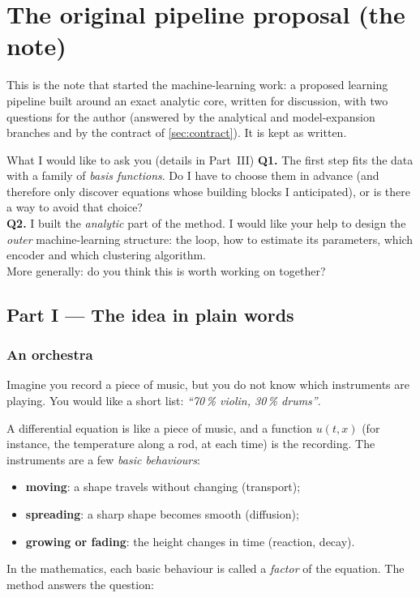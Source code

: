 \section{The original pipeline proposal (the note)}\label{app:note}
\noindent This is the note that started the machine-learning work: a proposed learning pipeline built around an exact analytic core, written for discussion, with two questions for the author (answered by the analytical and model-expansion branches and by the contract of \cref{sec:contract}). It is kept as written.




\begin{askbox}{What I would like to ask you (details in Part~III)}
\textbf{Q1.} The first step fits the data with a family of \emph{basis functions}. Do I have to choose them in advance (and therefore only discover equations whose building blocks I anticipated), or is there a way to avoid that choice?\\[2pt]
\textbf{Q2.} I built the \emph{analytic} part of the method. I would like your help to design the \emph{outer} machine-learning structure: the loop, how to estimate its parameters, which encoder and which clustering algorithm.\\[2pt]
More generally: do you think this is worth working on together?
\end{askbox}

\tableofcontents

\subsection*{Part I --- The idea in plain words}

\subsubsection*{An orchestra}
Imagine you record a piece of music, but you do not know which instruments are playing. You would like a short list: \emph{``70\,\% violin, 30\,\% drums''}.

A differential equation is like a piece of music, and a function $u(t,x)$ (for instance, the temperature along a rod, at each time) is the recording. The instruments are a few \emph{basic behaviours}:
\begin{itemize}[nosep]
\item \textbf{moving}: a shape travels without changing (transport);
\item \textbf{spreading}: a sharp shape becomes smooth (diffusion);
\item \textbf{growing or fading}: the height changes in time (reaction, decay).
\end{itemize}
In the mathematics, each basic behaviour is called a \emph{factor} of the equation. The method answers the question:


